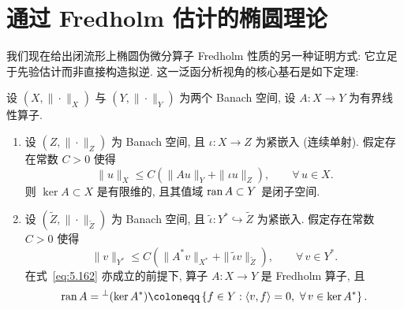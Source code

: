 \section{通过 Fredholm 估计的椭圆理论}\label{sec:5.12}
%
%

我们现在给出闭流形上椭圆伪微分算子 Fredholm 性质的另一种证明方式: 它立足于先验估计而非直接构造拟逆. 这一泛函分析视角的核心基石是如下定理:

\begin{proposition}[Fredholm 估计]\label{prop:5.74}
设 $(X, \|\cdot\|_X)$ 与 $(Y, \|\cdot\|_Y)$ 为两个 Banach 空间, 设 $A \colon X \to Y$ 为有界线性算子.
\begin{enumerate}
    \item 设 $(Z, \|\cdot\|_Z)$ 为 Banach 空间, 且 $\iota \colon X \to Z$ 为紧嵌入 (连续单射). 假定存在常数 $C > 0$ 使得
    \begin{equation}\label{eq:5.162}
        \|u\|_X \le C \left( \|A u\|_Y + \|\iota u\|_Z \right), \qquad \forall\,u \in X.
    \end{equation}
    则 $\ker A \subset X$ 是有限维的, 且其值域 $\operatorname{ran} A \subset Y$ 是闭子空间.
    \item 设 $(\tilde{Z}, \|\cdot\|_{\tilde{Z}})$ 为 Banach 空间, 且 $\tilde{\iota} \colon Y^* \hookrightarrow \tilde{Z}$ 为紧嵌入. 假定存在常数 $C > 0$ 使得
    \begin{equation}\label{eq:5.163}
        \|v\|_{Y^*} \le C \left( \|A^* v\|_{X^*} + \|\tilde{\iota} v\|_{\tilde{Z}} \right), \qquad \forall\,v \in Y^*.
    \end{equation}
    在式~\eqref{eq:5.162} 亦成立的前提下, 算子 $A \colon X \to Y$ 是 Fredholm 算子, 且
    \[
        \ran A = {}^\perp(\ker A^*) \defeq \left\{ f \in Y : \langle v, f \rangle = 0, \ \forall\,v \in \ker A^* \right\}.
    \]
\end{enumerate}
\end{proposition}

